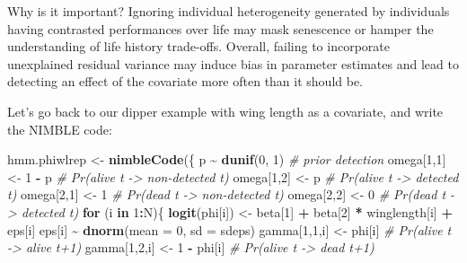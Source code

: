 \documentclass[
  12pt,
]{krantz}
\newenvironment{Shaded}{\begin{snugshade}}{\end{snugshade}}
\newcommand{\AttributeTok}[1]{\textcolor[rgb]{0.13,0.29,0.53}{#1}}
\newcommand{\CommentTok}[1]{\textcolor[rgb]{0.56,0.35,0.01}{\textit{#1}}}
\newcommand{\ControlFlowTok}[1]{\textcolor[rgb]{0.13,0.29,0.53}{\textbf{#1}}}
\newcommand{\DecValTok}[1]{\textcolor[rgb]{0.00,0.00,0.81}{#1}}
\newcommand{\FunctionTok}[1]{\textcolor[rgb]{0.13,0.29,0.53}{\textbf{#1}}}
\newcommand{\NormalTok}[1]{#1}
\newcommand{\OtherTok}[1]{\textcolor[rgb]{0.56,0.35,0.01}{#1}}
\newcommand{\SpecialCharTok}[1]{\textcolor[rgb]{0.81,0.36,0.00}{\textbf{#1}}}
\begin{document}
Why is it important? Ignoring individual heterogeneity generated by individuals having contrasted performances over life may mask senescence or hamper the understanding of life history trade-offs. Overall, failing to incorporate unexplained residual variance may induce bias in parameter estimates and lead to detecting an effect of the covariate more often than it should be.

Let's go back to our dipper example with wing length as a covariate, and write the NIMBLE code:

\begin{Shaded}
\begin{Highlighting}[]
\NormalTok{hmm.phiwlrep }\OtherTok{\textless{}{-}} \FunctionTok{nimbleCode}\NormalTok{(\{}
\NormalTok{    p }\SpecialCharTok{\textasciitilde{}} \FunctionTok{dunif}\NormalTok{(}\DecValTok{0}\NormalTok{, }\DecValTok{1}\NormalTok{)             }\CommentTok{\# prior detection}
\NormalTok{    omega[}\DecValTok{1}\NormalTok{,}\DecValTok{1}\NormalTok{] }\OtherTok{\textless{}{-}} \DecValTok{1} \SpecialCharTok{{-}}\NormalTok{ p         }\CommentTok{\# Pr(alive t {-}\textgreater{} non{-}detected t)}
\NormalTok{    omega[}\DecValTok{1}\NormalTok{,}\DecValTok{2}\NormalTok{] }\OtherTok{\textless{}{-}}\NormalTok{ p             }\CommentTok{\# Pr(alive t {-}\textgreater{} detected t)}
\NormalTok{    omega[}\DecValTok{2}\NormalTok{,}\DecValTok{1}\NormalTok{] }\OtherTok{\textless{}{-}} \DecValTok{1}             \CommentTok{\# Pr(dead t {-}\textgreater{} non{-}detected t)}
\NormalTok{    omega[}\DecValTok{2}\NormalTok{,}\DecValTok{2}\NormalTok{] }\OtherTok{\textless{}{-}} \DecValTok{0}             \CommentTok{\# Pr(dead t {-}\textgreater{} detected t)}
  \ControlFlowTok{for}\NormalTok{ (i }\ControlFlowTok{in} \DecValTok{1}\SpecialCharTok{:}\NormalTok{N)\{}
    \FunctionTok{logit}\NormalTok{(phi[i]) }\OtherTok{\textless{}{-}}\NormalTok{ beta[}\DecValTok{1}\NormalTok{] }\SpecialCharTok{+}\NormalTok{ beta[}\DecValTok{2}\NormalTok{] }\SpecialCharTok{*}\NormalTok{ winglength[i] }\SpecialCharTok{+}\NormalTok{ eps[i]}
\NormalTok{    eps[i] }\SpecialCharTok{\textasciitilde{}} \FunctionTok{dnorm}\NormalTok{(}\AttributeTok{mean =} \DecValTok{0}\NormalTok{, }\AttributeTok{sd =}\NormalTok{ sdeps)}
\NormalTok{    gamma[}\DecValTok{1}\NormalTok{,}\DecValTok{1}\NormalTok{,i] }\OtherTok{\textless{}{-}}\NormalTok{ phi[i]      }\CommentTok{\# Pr(alive t {-}\textgreater{} alive t+1)}
\NormalTok{    gamma[}\DecValTok{1}\NormalTok{,}\DecValTok{2}\NormalTok{,i] }\OtherTok{\textless{}{-}} \DecValTok{1} \SpecialCharTok{{-}}\NormalTok{ phi[i]  }\CommentTok{\# Pr(alive t {-}\textgreater{} dead t+1)}

\end{Highlighting}
\end{Shaded}
\end{document}
